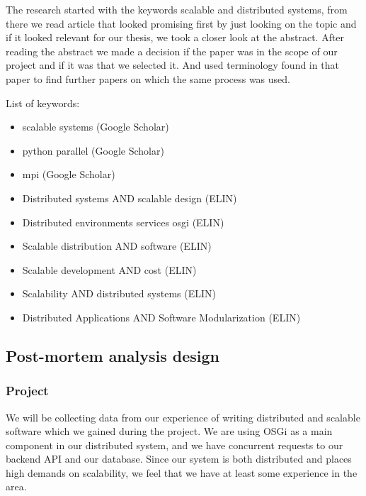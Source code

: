 \documentclass{article}
\begin{document}
The research started with the keywords scalable and distributed systems,
from there we read article that looked promising first by just looking on
the topic and if it looked relevant for our thesis, we took a closer look
at the abstract. After reading the abstract we made a decision if the paper
was in the scope of our project and if it was that we selected it. And used
terminology found in that paper to find further papers on which the same 
process was used. 
\newline

List of keywords:
\begin{itemize}
\item{scalable systems (Google Scholar)}
\item{python parallel (Google Scholar)}
\item{mpi (Google Scholar)}
\item{Distributed systems AND scalable design (ELIN)}
\item{Distributed environments services osgi (ELIN)}
\item{Scalable distribution AND software (ELIN)}
\item{Scalable development AND cost (ELIN)}
\item{Scalability AND distributed systems (ELIN)}
\item{Distributed Applications AND Software Modularization (ELIN)}
\end{itemize}

\subsection{Post-mortem analysis design}

\subsubsection{Project}
We will be collecting data from our experience of writing distributed and
scalable software which we gained during the project. We are using OSGi
\cite{marples2001open} as a main component in our distributed system, and we
have concurrent requests to our backend API and our database. Since our system
is both distributed and places high demands on scalability, we feel that we
have at least some experience in the area.
\end{document}
